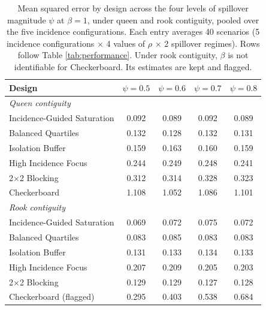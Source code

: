 \documentclass[11pt]{article}
\begin{document}
\iffullsi
\begin{table}[!htb]

\small
\centering

\caption{Mean squared error by design across the four levels of spillover magnitude $\psi$ at $\beta = 1$, under queen and rook contiguity, pooled over the five incidence configurations. Each entry averages 40 scenarios (5 incidence configurations $\times$ 4 values of $\rho$ $\times$ 2 spillover regimes). Rows follow Table \ref{tab:performance}. Under rook contiguity, $\beta$ is not identifiable for Checkerboard. Its estimates are kept and flagged.}
\label{tab:psi}

\begin{tabular}{lcccc}

\toprule
Design & $\psi=0.5$ & $\psi=0.6$ & $\psi=0.7$ & $\psi=0.8$ \\

\midrule
\multicolumn{5}{l}{\textit{Queen contiguity}} \\
Incidence-Guided Saturation & 0.092 & 0.089 & 0.092 & 0.089 \\
Balanced Quartiles & 0.132 & 0.128 & 0.132 & 0.131 \\
Isolation Buffer & 0.159 & 0.163 & 0.160 & 0.159 \\
High Incidence Focus & 0.244 & 0.249 & 0.248 & 0.241 \\
2$\times$2 Blocking & 0.312 & 0.314 & 0.328 & 0.323 \\
Checkerboard & 1.108 & 1.052 & 1.086 & 1.101 \\

\midrule
\multicolumn{5}{l}{\textit{Rook contiguity}} \\
Incidence-Guided Saturation & 0.069 & 0.072 & 0.075 & 0.072 \\
Balanced Quartiles & 0.083 & 0.085 & 0.083 & 0.083 \\
Isolation Buffer & 0.131 & 0.133 & 0.134 & 0.133 \\
High Incidence Focus & 0.207 & 0.209 & 0.205 & 0.203 \\
2$\times$2 Blocking & 0.129 & 0.129 & 0.127 & 0.128 \\
Checkerboard (flagged) & 0.295 & 0.403 & 0.538 & 0.684 \\

\bottomrule

\end{tabular}

\end{table}
\fi
\end{document}
